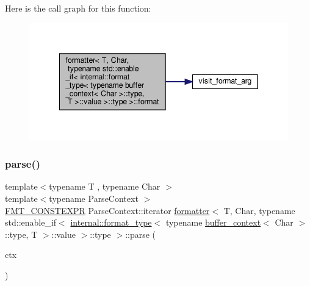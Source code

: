 Here is the call graph for this function\+:
\nopagebreak
\begin{figure}[H]
\begin{center}
\leavevmode
\includegraphics[width=342pt]{structformatter_3_01_t_00_01_char_00_01typename_01std_1_1enable__if_3_01internal_1_1format__typeef2b7d59b5441fbead72290e06693dea_a8274845c3589a2e3de1ce4cd19739788_cgraph}
\end{center}
\end{figure}
\mbox{\label{structformatter_3_01_t_00_01_char_00_01typename_01std_1_1enable__if_3_01internal_1_1format__typeef2b7d59b5441fbead72290e06693dea_ae66fc4d23664a9533b055208fa9692bf}} 
\subsubsection{\texorpdfstring{parse()}{parse()}}
{\footnotesize\ttfamily template$<$typename T , typename Char $>$ \\
template$<$typename Parse\+Context $>$ \\
\hyperlink{core_8h_a69201cb276383873487bf68b4ef8b4cd}{F\+M\+T\+\_\+\+C\+O\+N\+S\+T\+E\+X\+PR} Parse\+Context\+::iterator \hyperlink{structformatter}{formatter}$<$ T, Char, typename std\+::enable\+\_\+if$<$ \hyperlink{structinternal_1_1format__type}{internal\+::format\+\_\+type}$<$ typename \hyperlink{structbuffer__context}{buffer\+\_\+context}$<$ Char $>$\+::type, T $>$\+::value $>$\+::type $>$\+::parse (\begin{DoxyParamCaption}\item[{Parse\+Context \&}]{ctx }\end{DoxyParamCaption})\hspace{0.3cm}{\ttfamily [inline]}}



